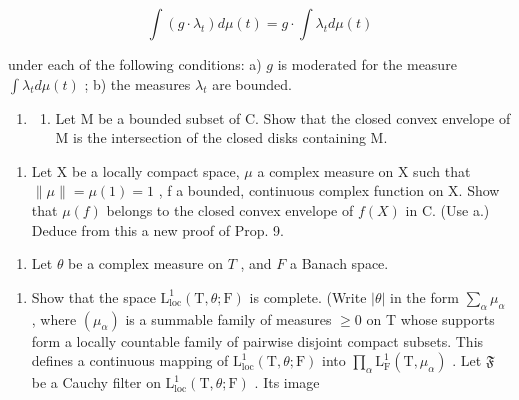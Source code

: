\[
\int (g \cdot \lambda_ {t}) d \mu (t) = g \cdot \int \lambda_ {t} d \mu (t)
\]

under each of the following conditions: a) \(g\) is moderated for the measure \(\int \lambda_t d\mu(t)\) ; b) the measures \(\lambda_t\) are bounded.

\begin{enumerate}
\def\labelenumi{\arabic{enumi})}
\setcounter{enumi}{29}
\tightlist
\item
  \begin{enumerate}
  \def\labelenumii{\alph{enumii})}
  \tightlist
  \item
    Let M be a bounded subset of C. Show that the closed convex envelope of M is the intersection of the closed disks containing M.
  \end{enumerate}
\end{enumerate}

\begin{enumerate}
\def\labelenumi{\alph{enumi})}
\setcounter{enumi}{1}
\tightlist
\item
  Let X be a locally compact space, \(\mu\) a complex measure on X such that \(\|\mu\| = \mu(1) = 1\) , f a bounded, continuous complex function on X. Show that \(\mu(f)\) belongs to the closed convex envelope of \(f(X)\) in C. (Use a.) Deduce from this a new proof of Prop. 9.
\end{enumerate}

\begin{enumerate}
\def\labelenumi{\arabic{enumi})}
\setcounter{enumi}{30}
\tightlist
\item
  Let \(\theta\) be a complex measure on \(T\) , and \(F\) a Banach space.
\end{enumerate}

\begin{enumerate}
\def\labelenumi{\alph{enumi})}
\tightlist
\item
  Show that the space \(\mathrm{L}_{\mathrm{loc}}^{1}(\mathrm{T},\theta ;\mathrm{F})\) is complete. (Write \(|\theta |\) in the form \(\sum_{\alpha}\mu_{\alpha}\) , where \((\mu_{\alpha})\) is a summable family of measures \(\geqslant 0\) on T whose supports form a locally countable family of pairwise disjoint compact subsets. This defines a continuous mapping of \(\mathrm{L}_{\mathrm{loc}}^{1}(\mathrm{T},\theta ;\mathrm{F})\) into \(\prod_{\alpha}\mathrm{L}_{\mathrm{F}}^{1}(\mathrm{T},\mu_{\alpha})\) . Let \(\mathfrak{F}\) be a Cauchy filter on \(\mathrm{L}_{\mathrm{loc}}^{1}(\mathrm{T},\theta ;\mathrm{F})\) . Its image
\end{enumerate}

